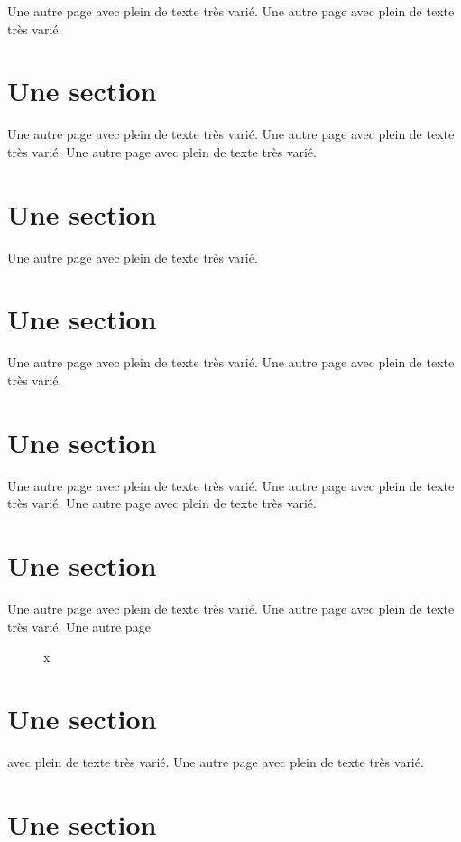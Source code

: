 \documentclass[11pt]{thesul}
\begin{document}
Une autre page avec plein de texte très varié.
Une autre page avec plein de texte très varié.

\section{Une section}

Une autre page avec plein de texte très varié.
Une autre page avec plein de texte très varié.
Une autre page avec plein de texte très varié.

\section{Une section}

Une autre page avec plein de texte très varié.

\section{Une section}

Une autre page avec plein de texte très varié.
Une autre page avec plein de texte très varié.

\section{Une section}

Une autre page avec plein de texte très varié.
Une autre page avec plein de texte très varié.
Une autre page avec plein de texte très varié.

\section{Une section}

Une autre page avec plein de texte très varié.
Une autre page avec plein de texte très varié.
Une autre page

\begin{figure}[htb]
\caption{x\label{rintintin}}
\end{figure}

\section{Une section}

avec plein de texte très varié.
Une autre page avec plein de texte très varié.

\section{Une section}
\end{document}
